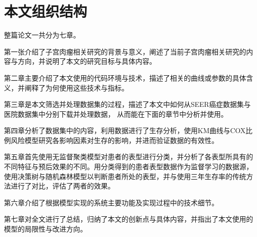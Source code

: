 \section{本文组织结构}

整篇论文一共分为七章。

第一张介绍了子宫肉瘤相关研究的背景与意义，阐述了当前子宫肉瘤相关研究的内容与方向，并说明了本文的研究目标与具体内容。

第二章主要介绍了本文使用的代码环境与技术，描述了相关的曲线或参数的具体含义，并阐释了为何使用这些技术与指标。

第三章是本文筛选并处理数据集的过程，描述了本文中如何从SEER癌症数据集与医院数据集中分别下载并处理数据，
从而能在下面的章节中分析并使用。

第四章分析了数据集中的内容，利用数据进行了生存分析，使用KM曲线与COX比例风险模型研究各影响因素对生存的影响，并进而验证数据的有效性。

第五章首先使用无监督聚类模型对患者的表型进行分类，并分析了各表型所具有的不同特征与预后效果的不同。用分类得到的患者表型数据作为监督学习的数据源，使用决策树与随机森林模型以判断患者所处的表型，并与使用三年生存率的传统方法进行了对比，评估了两者的效果。

第六章介绍了根据模型实现的系统主要功能及实现过程中的技术细节。

第七章对全文进行了总结，归纳了本文的创新点与具体内容，并指出了本文使用的模型的局限性与改进方向。

